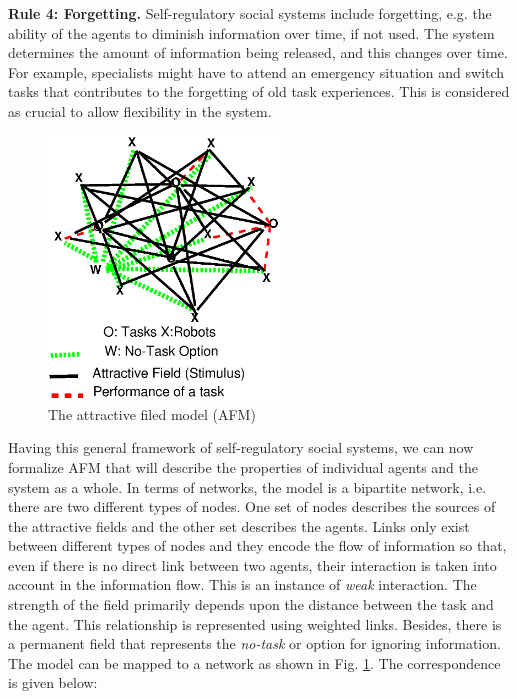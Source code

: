 \documentclass[preprint,12pt]{elsarticle}
\begin{document}
\textbf{Rule 4: Forgetting.} Self-regulatory social systems include forgetting, e.g. the ability of the agents to diminish information over time, if not used. The system determines the amount of information being released, and this changes over time. For example, specialists might have to attend an emergency situation and switch tasks that contributes to the forgetting of old task experiences. This is considered as crucial to allow flexibility in the system.
\begin{figure}
\centering
\includegraphics[height=7cm, angle=0]{./images/AFM-Diag2.eps}
\caption{The attractive filed model (AFM)}
\label{fig:afm} %
\end{figure}
Having this general framework of self-regulatory social systems, we can now formalize AFM that will describe the properties of individual  agents and the system as a whole. In terms of networks, the model is a bipartite network, i.e. there are two different types of nodes. One set of nodes describes the sources of the attractive fields and the other set describes the agents. Links only exist between different types of nodes and they encode the flow of information so that, even if there is no direct link between two agents, their interaction is taken into account in the information flow. This is an instance of {\em weak} interaction. The strength of the field primarily depends upon the distance between the task and the agent. This relationship is represented using weighted links. Besides, there is a permanent field that represents the {\em no-task} or  option for ignoring information. The model can be mapped to a network as shown in Fig. \ref{fig:afm}. The correspondence is given below:
\end{document}
